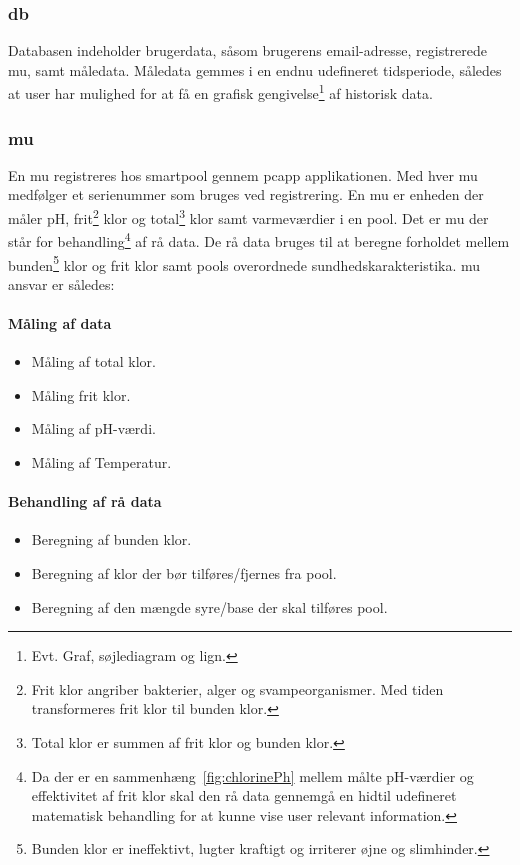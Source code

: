 \subsubsection{\gls{db}}
Databasen indeholder brugerdata, såsom brugerens email-adresse, registrerede \gls{mu}, samt måledata. Måledata gemmes i en endnu udefineret tidsperiode, således at \gls{user} har mulighed for at få en grafisk gengivelse\footnote{Evt. Graf, søjlediagram og lign.} af historisk data.

\subsubsection{\gls{mu}}
En \gls{mu} registreres hos \gls{smartpool} gennem \gls{pcapp} applikationen. Med hver \gls{mu} medfølger et serienummer som bruges ved registrering. En \gls{mu} er enheden der måler pH, frit\footnote{Frit klor angriber bakterier, alger og svampeorganismer. Med tiden transformeres frit klor til bunden klor.} klor og total\footnote{Total klor er summen af frit klor og bunden klor.} klor samt varmeværdier i en \gls{pool}. Det er \gls{mu} der står for behandling\footnote{Da der er en sammenhæng~\ref{fig:chlorinePh} mellem målte pH-værdier og effektivitet af frit klor skal den rå data gennemgå en hidtil udefineret matematisk behandling for at kunne vise \gls{user} relevant information.} af rå data. De rå data bruges til at beregne forholdet mellem bunden\footnote{Bunden klor er ineffektivt, lugter kraftigt og irriterer øjne og slimhinder.} klor og frit klor samt \glspl{pool} overordnede sundhedskarakteristika. \gls{mu} ansvar er således:


\paragraph{Måling af data}
\begin{itemize}
	\item Måling af total klor.
	\item Måling frit klor.
	\item Måling af pH-værdi.
	\item Måling af Temperatur.
\end{itemize}

\paragraph{Behandling af rå data}
\begin{itemize}
	\item Beregning af bunden klor.
	\item Beregning af klor der bør tilføres/fjernes fra \gls{pool}.
	\item Beregning af den mængde syre/base der skal tilføres \gls{pool}.
\end{itemize}

